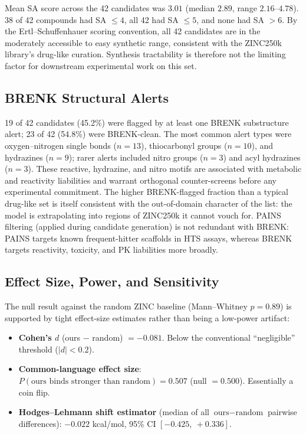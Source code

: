 \documentclass[11pt]{article}
\begin{document}
Mean SA score across the 42 candidates was $3.01$ (median $2.89$, range $2.16$--$4.78$). 38 of 42 compounds had SA $\leq 4$, all 42 had SA $\leq 5$, and none had SA $> 6$. By the Ertl--Schuffenhauer scoring convention, all 42 candidates are in the moderately accessible to easy synthetic range, consistent with the ZINC250k library's drug-like curation. Synthesis tractability is therefore not the limiting factor for downstream experimental work on this set.

\subsection{BRENK Structural Alerts}

19 of 42 candidates (45.2\%) were flagged by at least one BRENK substructure alert; 23 of 42 (54.8\%) were BRENK-clean. The most common alert types were oxygen--nitrogen single bonds ($n = 13$), thiocarbonyl groups ($n = 10$), and hydrazines ($n = 9$); rarer alerts included nitro groups ($n = 3$) and acyl hydrazines ($n = 3$). These reactive, hydrazine, and nitro motifs are associated with metabolic and reactivity liabilities and warrant orthogonal counter-screens before any experimental commitment. The higher BRENK-flagged fraction than a typical drug-like set is itself consistent with the out-of-domain character of the list: the model is extrapolating into regions of ZINC250k it cannot vouch for. PAINS filtering (applied during candidate generation) is not redundant with BRENK: PAINS targets known frequent-hitter scaffolds in HTS assays, whereas BRENK targets reactivity, toxicity, and PK liabilities more broadly.

\subsection{Effect Size, Power, and Sensitivity}

The null result against the random ZINC baseline (Mann--Whitney $p = 0.89$) is supported by tight effect-size estimates rather than being a low-power artifact:

\begin{itemize}
\item \textbf{Cohen's $d$} (ours $-$ random) $= -0.081$. Below the conventional ``negligible'' threshold ($|d| < 0.2$).
\item \textbf{Common-language effect size}: $P(\text{ours binds stronger than random}) = 0.507$ (null $= 0.500$). Essentially a coin flip.
\item \textbf{Hodges--Lehmann shift estimator} (median of all $\text{ours}-\text{random}$ pairwise differences): $-0.022$ kcal/mol, 95\% CI $[-0.425,\ +0.336]$.
\end{itemize}
\end{document}
